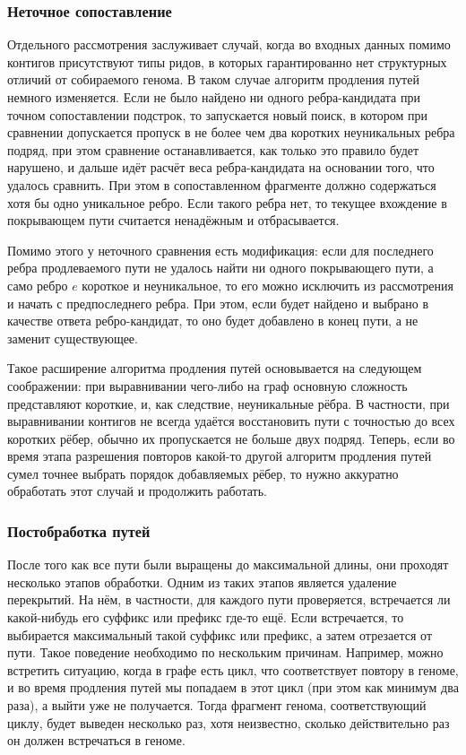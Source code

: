 \documentclass[14pt]{matmex-diploma-custom}
\begin{document}
\subsubsection{Неточное сопоставление}
Отдельного рассмотрения заслуживает случай, когда во входных данных помимо контигов присутствуют типы ридов, в которых гарантированно нет структурных отличий от собираемого генома. В таком случае алгоритм продления путей немного изменяется. Если не было найдено ни одного ребра-кандидата при точном сопоставлении подстрок, то запускается новый поиск, в котором при сравнении допускается пропуск в не более чем два коротких неуникальных ребра подряд, при этом сравнение останавливается, как только это правило будет нарушено, и дальше идёт расчёт веса ребра-кандидата на основании того, что удалось сравнить. При этом в сопоставленном фрагменте должно содержаться хотя бы одно уникальное ребро. Если такого ребра нет, то текущее вхождение в покрывающем пути считается ненадёжным и отбрасывается.

Помимо этого у неточного сравнения есть модификация: если для последнего ребра продлеваемого пути не удалось найти ни одного покрывающего пути, а само ребро $e$ короткое и неуникальное, то его можно исключить из рассмотрения и начать с предпоследнего ребра. При этом, если будет найдено и выбрано в качестве ответа ребро-кандидат, то оно будет добавлено в конец пути, а не заменит существующее.

Такое расширение алгоритма продления путей основывается на следующем соображении: при выравнивании чего-либо на граф основную сложность представляют короткие, и, как следствие, неуникальные рёбра. В частности, при выравнивании контигов не всегда удаётся восстановить пути с точностью до всех коротких рёбер, обычно их пропускается не больше двух подряд. Теперь, если во время этапа разрешения повторов какой-то  другой алгоритм продления путей сумел точнее выбрать порядок добавляемых рёбер, то нужно аккуратно обработать этот случай и продолжить работать.

\subsubsection{Постобработка путей}
После того как все пути были выращены до максимальной длины, они проходят несколько этапов обработки. Одним из таких этапов является удаление перекрытий. На нём, в частности, для каждого пути проверяется, встречается ли какой-нибудь его суффикс или префикс где-то ещё. Если встречается, то выбирается максимальный такой суффикс или префикс, а затем отрезается от пути. Такое поведение необходимо по нескольким причинам. Например, можно встретить ситуацию, когда в графе есть цикл, что соответствует повтору в геноме, и во время продления путей мы попадаем в этот цикл (при этом как минимум два раза), а выйти уже не получается. Тогда фрагмент генома, соответствующий циклу, будет выведен несколько раз, хотя неизвестно, сколько действительно раз он должен встречаться в геноме. 
\end{document}

